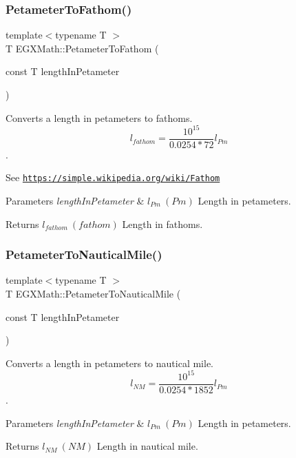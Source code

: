 \subsubsection{\texorpdfstring{Petameter\+To\+Fathom()}{PetameterToFathom()}}
{\footnotesize\ttfamily template$<$typename T $>$ \\
T E\+G\+X\+Math\+::\+Petameter\+To\+Fathom (\begin{DoxyParamCaption}\item[{const T}]{length\+In\+Petameter }\end{DoxyParamCaption})}



Converts a length in petameters to fathoms. \[ l_{fathom}= \frac{10^{15}}{0.0254 * 72} l_{Pm} \]. 

See \href{https://simple.wikipedia.org/wiki/Fathom}{\tt https\+://simple.\+wikipedia.\+org/wiki/\+Fathom} 
\begin{DoxyParams}{Parameters}
{\em length\+In\+Petameter} & $ l_{Pm}\ (Pm)$ Length in petameters. \\
\hline
\end{DoxyParams}
\begin{DoxyReturn}{Returns}
$ l_{fathom}\ (fathom)$ Length in fathoms. 
\end{DoxyReturn}
\mbox{\label{group___e_g_x_math-_conversions-_length_conversions-_s_i-_petameter-_nautical_gad71d96fd4a94e830ae0e768a41d993af}} 
\subsubsection{\texorpdfstring{Petameter\+To\+Nautical\+Mile()}{PetameterToNauticalMile()}}
{\footnotesize\ttfamily template$<$typename T $>$ \\
T E\+G\+X\+Math\+::\+Petameter\+To\+Nautical\+Mile (\begin{DoxyParamCaption}\item[{const T}]{length\+In\+Petameter }\end{DoxyParamCaption})}



Converts a length in petameters to nautical mile. \[ l_{NM}= \frac{10^{15}}{0.0254 * 1852} l_{Pm} \]. 


\begin{DoxyParams}{Parameters}
{\em length\+In\+Petameter} & $ l_{Pm}\ (Pm)$ Length in petameters. \\
\hline
\end{DoxyParams}
\begin{DoxyReturn}{Returns}
$ l_{NM}\ (NM)$ Length in nautical mile. 
\end{DoxyReturn}
